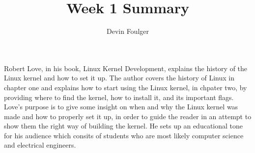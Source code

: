 \documentclass[letterpaper, 10pt, titlepage]{article}
\begin{document}
\title{Week 1 Summary}
\author{Devin Foulger}

Robert Love, in his book, Linux Kernel Development, explains the history of the Linux kernel and how to set it up. 
The author covers the history of Linux in chapter one and explains how to start using the Linux kernel, in chpater two,
by providing where to find the kernel, how to install it, and its important flags. Love's purpose is to give some
insight on when and why the Linux kernel was made and how to properly set it up, in order to guide the reader in an
attempt to show them the right way of building the kernel. He sets up an educational tone for his audience which 
consits of students who are most likely computer science and electrical engineers.
\end{document}
